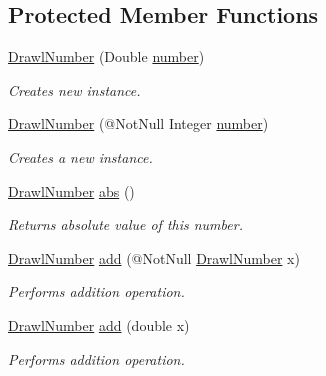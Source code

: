 \subsection*{Protected Member Functions}
\begin{DoxyCompactItemize}
\item 
\hyperlink{classcom_1_1aarrelaakso_1_1drawl_1_1_drawl_number_a81611ec54e7b92b8f95a11b2361c227d}{Drawl\+Number} (Double \hyperlink{classcom_1_1aarrelaakso_1_1drawl_1_1_drawl_number_a9fe9f40163a4f5581b35d61ecf63f278}{number})
\begin{DoxyCompactList}\small\item\em Creates new instance. \end{DoxyCompactList}\item 
\hyperlink{classcom_1_1aarrelaakso_1_1drawl_1_1_drawl_number_ae5746d5e9b11498f3f081bf4b02da1b3}{Drawl\+Number} (@Not\+Null Integer \hyperlink{classcom_1_1aarrelaakso_1_1drawl_1_1_drawl_number_a9fe9f40163a4f5581b35d61ecf63f278}{number})
\begin{DoxyCompactList}\small\item\em Creates a new instance. \end{DoxyCompactList}\item 
\hyperlink{classcom_1_1aarrelaakso_1_1drawl_1_1_drawl_number}{Drawl\+Number} \hyperlink{classcom_1_1aarrelaakso_1_1drawl_1_1_drawl_number_a81855ee2830f208ee7fd212508519d7f}{abs} ()
\begin{DoxyCompactList}\small\item\em Returns absolute value of this number. \end{DoxyCompactList}\item 
\hyperlink{classcom_1_1aarrelaakso_1_1drawl_1_1_drawl_number}{Drawl\+Number} \hyperlink{classcom_1_1aarrelaakso_1_1drawl_1_1_drawl_number_a58b3ee7a390b84fa0b9a19d52a8bb8dc}{add} (@Not\+Null \hyperlink{classcom_1_1aarrelaakso_1_1drawl_1_1_drawl_number}{Drawl\+Number} x)
\begin{DoxyCompactList}\small\item\em Performs addition operation. \end{DoxyCompactList}\item 
\hyperlink{classcom_1_1aarrelaakso_1_1drawl_1_1_drawl_number}{Drawl\+Number} \hyperlink{classcom_1_1aarrelaakso_1_1drawl_1_1_drawl_number_ad8a8c1d2ce5aa63334b2bdce9bd7bb54}{add} (double x)
\begin{DoxyCompactList}\small\item\em Performs addition operation. \end{DoxyCompactList}\item 

\end{DoxyCompactItemize}
